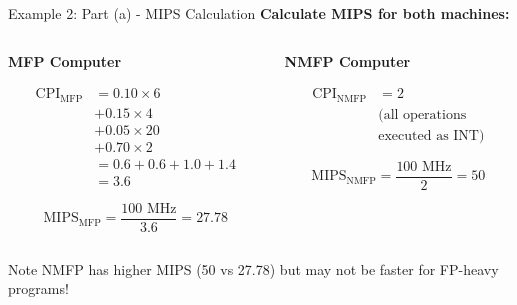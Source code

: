 \documentclass[aspectratio=169,12pt]{beamer}
\begin{document}
\begin{frame}{Example 2: Part (a) - MIPS Calculation}
\textbf{Calculate MIPS for both machines:}

\vspace{0.3cm}
\begin{columns}[T]
\begin{column}{0.48\textwidth}
\centering
\textbf{MFP Computer}
\vspace{-0.5cm}

\small
\begin{align*}
\text{CPI}_{\text{MFP}} &= 0.10 \times 6 \\
&+ 0.15 \times 4 \\
&+ 0.05 \times 20 \\
&+ 0.70 \times 2 \\
&= 0.6 + 0.6 + 1.0 + 1.4 \\
&= 3.6
\end{align*}

\vspace{-0.5cm}
$$\text{MIPS}_{\text{MFP}} = \frac{100 \text{ MHz}}{3.6} = 27.78$$
\end{column}

\begin{column}{0.48\textwidth}
\centering
\textbf{NMFP Computer}
\vspace{-0.5cm}

\small
\begin{align*}
\text{CPI}_{\text{NMFP}} &= 2 \\
&\text{(all operations} \\
&\text{executed as INT)}
\end{align*}

\vspace{0.5cm}
$$\text{MIPS}_{\text{NMFP}} = \frac{100 \text{ MHz}}{2} = 50$$
\end{column}
\end{columns}

\vspace{0.5cm}
\begin{alertblock}{Note}
NMFP has higher MIPS (50 vs 27.78) but may not be faster for FP-heavy programs!
\end{alertblock}
\end{frame}
\end{document}

